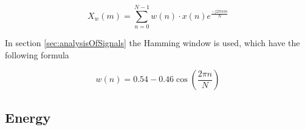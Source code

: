 \begin{equation}
X_w(m) = \sum_{n=0}^{N-1} w(n)\cdot x(n)e^{\frac{-j2\pi nm}{N}}
\end{equation}

In section \ref{sec:analysisOfSignals} the Hamming window is used, which have the following formula

\begin{equation}
w(n) = 0.54-0.46\cos\left(\frac{2\pi n}{N}\right)
\end{equation}

\subsection{Energy}

